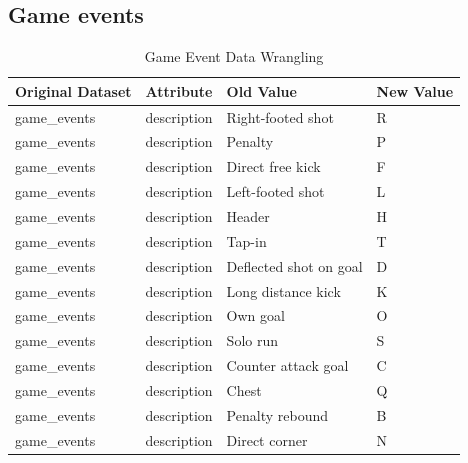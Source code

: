 \documentclass{Configuration_Files/PoliMi3i_thesis}
\begin{document}
\subsection{Game events}
\begin{table}[ht]
	\centering
	\begin{tabular}{|l|l|l|l|}
		\hline
    \rowcolor{bluepoli!40}
		\textbf{Original Dataset} & \textbf{Attribute} & \textbf{Old Value}     & \textbf{New Value} \\ \hline
		game\_events              & description        & Right-footed shot      & R                  \\ \hline
		game\_events              & description        & Penalty                & P                  \\ \hline
		game\_events              & description        & Direct free kick       & F                  \\ \hline
		game\_events              & description        & Left-footed shot       & L                  \\ \hline
		game\_events              & description        & Header                 & H                  \\ \hline
		game\_events              & description        & Tap-in                 & T                  \\ \hline
		game\_events              & description        & Deflected shot on goal & D                  \\ \hline
		game\_events              & description        & Long distance kick     & K                  \\ \hline
		game\_events              & description        & Own goal               & O                  \\ \hline
		game\_events              & description        & Solo run               & S                  \\ \hline
		game\_events              & description        & Counter attack goal    & C                  \\ \hline
		game\_events              & description        & Chest                  & Q                  \\ \hline
		game\_events              & description        & Penalty rebound        & B                  \\ \hline
		game\_events              & description        & Direct corner          & N                  \\ \hline
	\end{tabular}
	\caption{Game Event Data Wrangling}
	\label{your-label-here}
\end{table}
\end{document}
